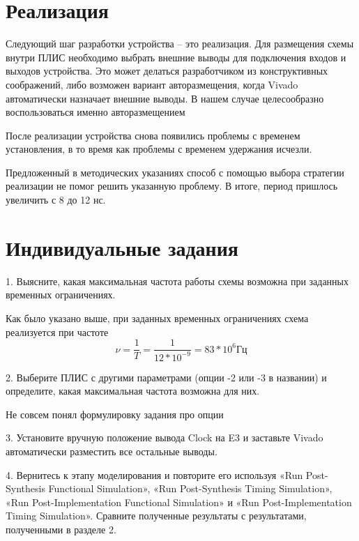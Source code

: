\begin{sloppypar}
\newpage
\section{Реализация} %
Следующий шаг разработки устройства – это реализация. Для размещения схемы внутри ПЛИС необходимо выбрать внешние выводы для подключения входов и выходов устройства. Это может делаться разработчиком из
конструктивных соображений, либо возможен вариант авторазмещения, когда Vivado автоматически назначает внешние выводы. В нашем случае целесообразно воспользоваться именно авторазмещением


После реализации устройства снова появились проблемы с временем установления, в то время как проблемы с временем удержания исчезли.


Предложенный в методических указаниях способ с помощью выбора стратегии реализации не помог решить указанную проблему. В итоге, период пришлось увеличить с 8 до 12 нс. 
\newpage
\section{Индивидуальные задания}%
1. Выясните, какая максимальная частота работы схемы возможна при заданных временных ограничениях.

Как было указано выше, при заданных временных ограничениях схема реализуется при частоте  	\begin{displaymath}\nu=\frac{1}{T}=\frac{1}{12*10^{-9}}=83*10^6 Гц\end{displaymath}


2. Выберите ПЛИС с другими параметрами (опции -2 или -3 в названии) и определите, какая максимальная частота возможна для них.

Не совсем понял формулировку задания про опции

3. Установите вручную положение вывода Clock на E3 и заставьте Vivado автоматически разместить все остальные выводы.

4. Вернитесь к этапу моделирования и повторите его используя «Run Post-Synthesis Functional Simulation», «Run Post-Synthesis Timing Simulation», «Run Post-Implementation Functional Simulation» и «Run Post-Implementation Timing Simulation». Сравните полученные результаты с результатами, полученными в разделе 2.


\end{sloppypar}
